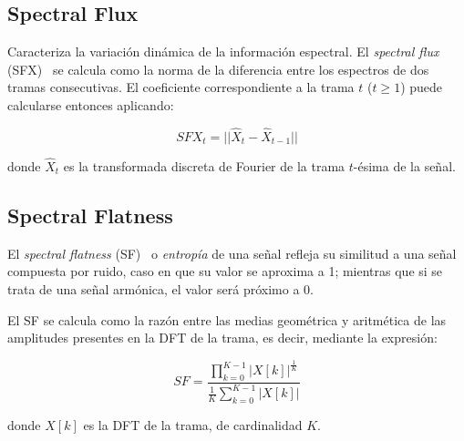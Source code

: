 \subsection{Spectral Flux}\label{subsec:spectralFlux}

Caracteriza la variación dinámica de la información espectral.
El \textit{spectral flux} (SFX)~\cite{Fagerlund07,Lasseck14,Zamanian17} se calcula como la norma de la diferencia entre los espectros de dos tramas consecutivas.
El coeficiente correspondiente a la trama $t$ ($t\geq 1$) puede calcularse entonces aplicando:

\begin{equation}
    \label{eq:SFX}
    SFX_t = ||\hat{X}_t -\hat{X}_{t-1}||
\end{equation}

\noindent
donde $\hat{X}_t$ es la transformada discreta de Fourier de la trama $t$-ésima de la señal.

\subsection{Spectral Flatness}\label{subsec:spectralFlatness}

El \textit{spectral flatness} (SF)~\cite{Fagerlund07,Peters04,Zamanian17} o \textit{entropía} de una señal refleja su similitud a una señal compuesta por ruido, caso en que su valor se aproxima a 1;
mientras que si se trata de una señal armónica, el valor será próximo a 0.

El SF se calcula como la razón entre las medias geométrica y aritmética de las amplitudes presentes en la DFT de la trama, es decir, mediante la expresión:

\begin{equation}
    \label{eq:SF}
    SF = \frac{\prod_{k=0}^{K-1}{|X[k]|}^{\frac{1}{K}}}{\frac{1}{K}\sum_{k=0}^{K-1}{|X[k]|}}
\end{equation}

\noindent
donde $X[k]$ es la DFT de la trama, de cardinalidad $K$.
